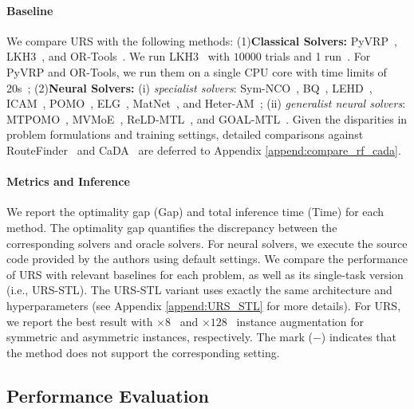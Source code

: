 \documentclass{article}
\theoremstyle{plain}
\theoremstyle{definition}
\theoremstyle{remark}
\begin{document}
\paragraph{Baseline}
We compare URS with the following methods: (1)\textbf{Classical Solvers:} PyVRP~\citep{wouda2024pyvrp}, LKH3~\citep{LKH3}, and OR-Tools~\citep{ortools}. We run LKH3~\citep{LKH3} with $10000$ trials and 1 run~\citep{kool2019attention}. For PyVRP and OR-Tools, we run them on a single CPU core with time limits of 20s~\citep{li2025cada};  (2)\textbf{Neural Solvers:} (i) \textit{specialist solvers}: Sym-NCO~\citep{kim2022symnco}, BQ~\citep{drakulic2023bq}, LEHD~\citep{luo2023lehd}, ICAM~\citep{zhou2024icam}, POMO~\citep{kwon2020pomo}, ELG~\citep{gao2023elg}, MatNet~\citep{kwon2021matnet}, and Heter-AM~\citep{li2021pdtsp}; (ii) \textit{generalist neural solvers}: MTPOMO~\citep{liu2024mtpomo}, MVMoE~\citep{zhou2024mvmoe}, ReLD-MTL~\citep{huang2025reld}, and GOAL-MTL~\citep{drakulic2025goal}. Given the disparities in problem formulations and training settings, detailed comparisons against RouteFinder~\citep{berto2024routefinder} and CaDA~\citep{li2025cada} are deferred to Appendix \ref{append:compare_rf_cada}.

\paragraph{Metrics and Inference}
We report the optimality gap (Gap) and total inference time (Time) for each method. The optimality gap quantifies the discrepancy between the corresponding solvers and oracle solvers. For neural solvers, we execute the source code provided by the authors using default settings. We compare the performance of URS with relevant baselines for each problem, as well as its single-task version (i.e., URS-STL). The URS-STL variant uses exactly the same architecture and hyperparameters (see Appendix \ref{append:URS_STL} for more details). For URS, we report the best result with $\times8$~\citep{kwon2020pomo} and $\times128$~\citep{kwon2021matnet} instance augmentation for symmetric and asymmetric instances, respectively. The mark ($-$) indicates that the method does not support the corresponding setting. 

\subsection{Performance Evaluation}
\end{document}
